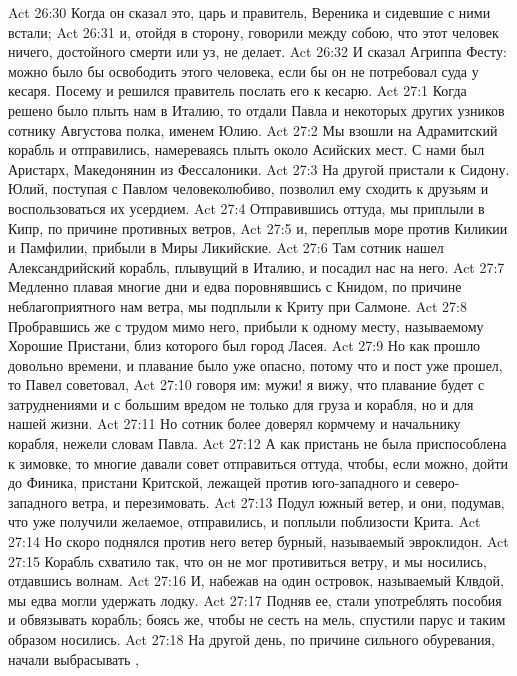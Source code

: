 \vs Act 26:30 Когда он сказал это, царь и правитель, Вереника и сидевшие с ними встали;
\vs Act 26:31 и, отойдя в сторону, говорили между собою, что этот человек ничего, достойного смерти или уз, не делает.
\vs Act 26:32 И сказал Агриппа Фесту: можно было бы освободить этого человека, если бы он не потребовал суда у кесаря. Посему и решился правитель послать его к кесарю.
\vs Act 27:1 Когда решено было плыть нам в Италию, то отдали Павла и некоторых других узников сотнику Августова полка, именем Юлию.
\vs Act 27:2 Мы взошли на Адрамитский корабль и отправились, намереваясь плыть около Асийских мест. С нами был Аристарх, Македонянин из Фессалоники.
\vs Act 27:3 На другой  пристали к Сидону. Юлий, поступая с Павлом человеколюбиво, позволил ему сходить к друзьям и воспользоваться их усердием.
\vs Act 27:4 Отправившись оттуда, мы приплыли в Кипр, по причине противных ветров,
\vs Act 27:5 и, переплыв море против Киликии и Памфилии, прибыли в Миры Ликийские.
\vs Act 27:6 Там сотник нашел Александрийский корабль, плывущий в Италию, и посадил нас на него.
\vs Act 27:7 Медленно плавая многие дни и едва поровнявшись с Книдом, по причине неблагоприятного нам ветра, мы подплыли к Криту при Салмоне.
\vs Act 27:8 Пробравшись же с трудом мимо него, прибыли к одному месту, называемому Хорошие Пристани, близ которого был город Ласея.
\vs Act 27:9 Но как прошло довольно времени, и плавание было уже опасно, потому что и пост уже прошел, то Павел советовал,
\vs Act 27:10 говоря им: мужи! я вижу, что плавание будет с затруднениями и с большим вредом не только для груза и корабля, но и для нашей жизни.
\vs Act 27:11 Но сотник более доверял кормчему и начальнику корабля, нежели словам Павла.
\vs Act 27:12 А как пристань не была приспособлена к зимовке, то многие давали совет отправиться оттуда, чтобы, если можно, дойти до Финика, пристани Критской, лежащей против юго-западного и северо-западного ветра, и  перезимовать.
\vs Act 27:13 Подул южный ветер, и они, подумав, что уже получили желаемое, отправились, и поплыли поблизости Крита.
\vs Act 27:14 Но скоро поднялся против него ветер бурный, называемый эвроклидон.
\vs Act 27:15 Корабль схватило так, что он не мог противиться ветру, и мы носились, отдавшись волнам.
\vs Act 27:16 И, набежав на один островок, называемый Клвдой, мы едва могли удержать лодку.
\vs Act 27:17 Подняв ее, стали употреблять пособия и обвязывать корабль; боясь же, чтобы не сесть на мель, спустили парус и таким образом носились.
\vs Act 27:18 На другой день, по причине сильного обуревания, начали выбрасывать ,

